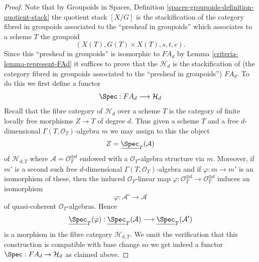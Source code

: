 \begin{proof}

Note that by
Groupoids in Spaces, Definition
\ref{spaces-groupoids-definition-quotient-stack}
the quotient stack $[X/G]$ is the stackification of the
category fibred in groupoids associated to the ``presheaf in groupoids''
which associates to a scheme $T$ the groupoid
$$
(X(T), G(T) \times X(T), s, t, c).
$$
Since this ``presheaf in groupoids'' is isomorphic to $FA_d$ by
Lemma \ref{criteria-lemma-represent-FAd}
it suffices to prove that the $\mathcal{H}_d$ is the stackification
of (the category fibred in groupoids associated to the
``presheaf in groupoids'') $FA_d$. To do this we first define a
functor
$$
\Spec : FA_d \longrightarrow \mathcal{H}_d
$$
Recall that the fibre category of $\mathcal{H}_d$ over a scheme $T$
is the category of finite locally free morphisms $Z \to T$ of degree $d$.
Thus given a scheme $T$ and a free $d$-dimensional
$\Gamma(T, \mathcal{O}_T)$-algebra $m$ we may assign to this the object
$$
Z = \underline{\Spec}_T(\mathcal{A})
$$
of $\mathcal{H}_{d, T}$
where $\mathcal{A} = \mathcal{O}_T^{\oplus d}$ endowed with a
$\mathcal{O}_T$-algebra structure via $m$. Moreover, if $m'$ is
a second such free $d$-dimensional $\Gamma(T, \mathcal{O}_T)$-algebra
and if $\varphi : m \to m'$ is an isomorphism of these, then
the induced $\mathcal{O}_T$-linear map
$\varphi : \mathcal{O}_T^{\oplus d} \to \mathcal{O}_T^{\oplus d}$
induces an isomorphism
$$
\varphi : \mathcal{A}' \longrightarrow \mathcal{A}
$$
of quasi-coherent $\mathcal{O}_T$-algebras. Hence
$$
\underline{\Spec}_T(\varphi) :
\underline{\Spec}_T(\mathcal{A})
\longrightarrow
\underline{\Spec}_T(\mathcal{A}')
$$
is a morphism in the fibre category $\mathcal{H}_{d, T}$. We omit the
verification that this construction is compatible with base change so
we get indeed a functor $\Spec : FA_d \to \mathcal{H}_d$
as claimed above.


\end{proof}
